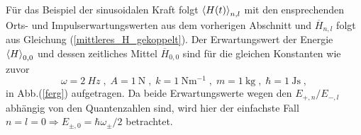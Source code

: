     Für das Beispiel der sinusoidalen Kraft folgt $\braket{H(t)}_{n,l}$ mit den ensprechenden Orts- und Impulserwartungswerten aus dem vorherigen Abschnitt und  $\overline{H}_{n,l}$ folgt aus Gleichung (\ref{mittleres_H_gekoppelt}).
    Der Erwartungswert der Energie $\braket H_{0,0}$ und dessen zeitliches Mittel $\overline{H}_{0,0}$ sind für die gleichen Konstanten wie zuvor
    \begin{equation}
      \omega=\SI{2}{Hz} \;,\; A=\SI{1}{\newton} \;,\; k=\SI{1}{\newton \meter^{-1}} \;,\; m=\SI{1}{\kilo \gram} \;,\; \hbar=\SI{1}{\joule \second}  \; ,
    \end{equation}
    in Abb.(\ref{ferg}) aufgetragen.
    Da beide Erwartungswerte wegen den $E_{+,n}/E_{-,l}$ abhängig von den Quantenzahlen sind, wird hier der einfachste Fall $n=l=0 \Rightarrow E_{\pm,0}=\hbar \omega_\pm/2$ betrachtet.
\iffalse
